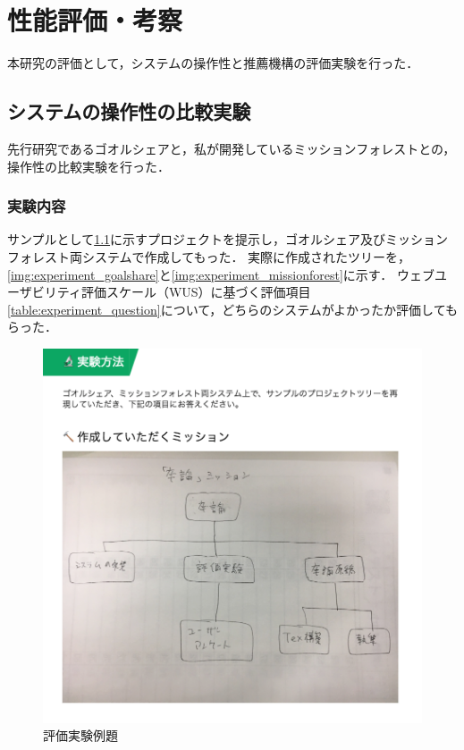 \chapter{性能評価・考察}
本研究の評価として，システムの操作性と推薦機構の評価実験を行った．

\section{システムの操作性の比較実験}
先行研究であるゴオルシェアと，私が開発しているミッションフォレストとの，操作性の比較実験を行った．

\subsection{実験内容}
サンプルとして\ref{img:experiment_question}に示すプロジェクトを提示し，ゴオルシェア及びミッションフォレスト両システムで作成してもった．
実際に作成されたツリーを，\ref{img:experiment_goalshare}と\ref{img:experiment_missionforest}に示す．
ウェブユーザビリティ評価スケール（WUS）に基づく評価項目\ref{table:experiment_question}について，どちらのシステムがよかったか評価してもらった．

\begin{figure}[t]
	\begin{center}
		\includegraphics[width=0.9\linewidth]{assets/img/experiment_question.png}
		\caption{評価実験例題}
		\label{img:experiment_question}
	\end{center}
\end{figure}

